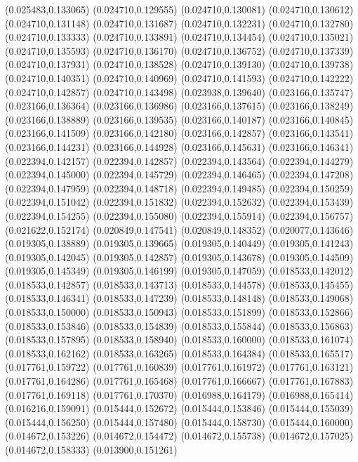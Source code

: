 (0.025483,0.133065)
(0.024710,0.129555)
(0.024710,0.130081)
(0.024710,0.130612)
(0.024710,0.131148)
(0.024710,0.131687)
(0.024710,0.132231)
(0.024710,0.132780)
(0.024710,0.133333)
(0.024710,0.133891)
(0.024710,0.134454)
(0.024710,0.135021)
(0.024710,0.135593)
(0.024710,0.136170)
(0.024710,0.136752)
(0.024710,0.137339)
(0.024710,0.137931)
(0.024710,0.138528)
(0.024710,0.139130)
(0.024710,0.139738)
(0.024710,0.140351)
(0.024710,0.140969)
(0.024710,0.141593)
(0.024710,0.142222)
(0.024710,0.142857)
(0.024710,0.143498)
(0.023938,0.139640)
(0.023166,0.135747)
(0.023166,0.136364)
(0.023166,0.136986)
(0.023166,0.137615)
(0.023166,0.138249)
(0.023166,0.138889)
(0.023166,0.139535)
(0.023166,0.140187)
(0.023166,0.140845)
(0.023166,0.141509)
(0.023166,0.142180)
(0.023166,0.142857)
(0.023166,0.143541)
(0.023166,0.144231)
(0.023166,0.144928)
(0.023166,0.145631)
(0.023166,0.146341)
(0.022394,0.142157)
(0.022394,0.142857)
(0.022394,0.143564)
(0.022394,0.144279)
(0.022394,0.145000)
(0.022394,0.145729)
(0.022394,0.146465)
(0.022394,0.147208)
(0.022394,0.147959)
(0.022394,0.148718)
(0.022394,0.149485)
(0.022394,0.150259)
(0.022394,0.151042)
(0.022394,0.151832)
(0.022394,0.152632)
(0.022394,0.153439)
(0.022394,0.154255)
(0.022394,0.155080)
(0.022394,0.155914)
(0.022394,0.156757)
(0.021622,0.152174)
(0.020849,0.147541)
(0.020849,0.148352)
(0.020077,0.143646)
(0.019305,0.138889)
(0.019305,0.139665)
(0.019305,0.140449)
(0.019305,0.141243)
(0.019305,0.142045)
(0.019305,0.142857)
(0.019305,0.143678)
(0.019305,0.144509)
(0.019305,0.145349)
(0.019305,0.146199)
(0.019305,0.147059)
(0.018533,0.142012)
(0.018533,0.142857)
(0.018533,0.143713)
(0.018533,0.144578)
(0.018533,0.145455)
(0.018533,0.146341)
(0.018533,0.147239)
(0.018533,0.148148)
(0.018533,0.149068)
(0.018533,0.150000)
(0.018533,0.150943)
(0.018533,0.151899)
(0.018533,0.152866)
(0.018533,0.153846)
(0.018533,0.154839)
(0.018533,0.155844)
(0.018533,0.156863)
(0.018533,0.157895)
(0.018533,0.158940)
(0.018533,0.160000)
(0.018533,0.161074)
(0.018533,0.162162)
(0.018533,0.163265)
(0.018533,0.164384)
(0.018533,0.165517)
(0.017761,0.159722)
(0.017761,0.160839)
(0.017761,0.161972)
(0.017761,0.163121)
(0.017761,0.164286)
(0.017761,0.165468)
(0.017761,0.166667)
(0.017761,0.167883)
(0.017761,0.169118)
(0.017761,0.170370)
(0.016988,0.164179)
(0.016988,0.165414)
(0.016216,0.159091)
(0.015444,0.152672)
(0.015444,0.153846)
(0.015444,0.155039)
(0.015444,0.156250)
(0.015444,0.157480)
(0.015444,0.158730)
(0.015444,0.160000)
(0.014672,0.153226)
(0.014672,0.154472)
(0.014672,0.155738)
(0.014672,0.157025)
(0.014672,0.158333)
(0.013900,0.151261)
